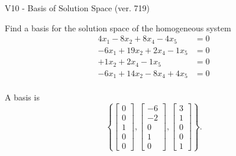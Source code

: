 \begin{exercise}
  \begin{exerciseTitle}V10 - Basis of Solution Space (ver. 719)\end{exerciseTitle}
  \begin{exerciseStatement}
    Find a basis for the solution space of the homogeneous system 
\begin{align*}
 4 x_ 1 -8 x_ 2 + 8 x_ 4 -4 x_ 5 &= 0  \\ 
  -6 x_ 1 + 19 x_ 2 + 2 x_ 4 -1 x_ 5 &= 0  \\ 
  + 1 x_ 2 + 2 x_ 4 -1 x_ 5 &= 0  \\ 
  -6 x_ 1 + 14 x_ 2 -8 x_ 4 + 4 x_ 5 &= 0  \\ 
 \end{align*}


 
  \end{exerciseStatement}

  \begin{exerciseAnswer}
   A basis is   
\[\left\{\left[\begin{array}{c}
0 \\
0 \\
1 \\
0 \\
0
\end{array}\right] , \left[\begin{array}{c}
-6 \\
-2 \\
0 \\
1 \\
0
\end{array}\right] , \left[\begin{array}{c}
3 \\
1 \\
0 \\
0 \\
1
\end{array}\right]\right\}.\]

  


  \end{exerciseAnswer}
\end{exercise}